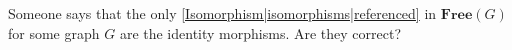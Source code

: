 
Someone says that the only \ref{Isomorphism|isomorphisms|referenced} in $\mathbf{Free}(G)$ for some graph $G$ are the identity morphisms. Are they correct?